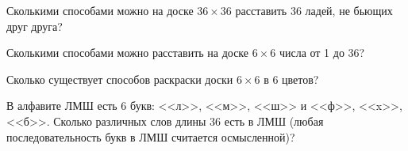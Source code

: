 \begin{problems}
\item Сколькими способами можно на доске $36\times36$  расставить 36 ладей, не бьющих друг друга? %

\item Сколькими способами можно расставить на доске $6\times6$ числа от 1 до 36? %

\item Сколько существует способов раскраски доски $6\times6$ в 6 цветов? %

\item В алфавите ЛМШ есть 6 букв: <<л>>, <<м>>, <<ш>> и <<ф>>, <<x>>, <<б>>. Сколько различных слов длины 36 есть в ЛМШ (любая последовательность букв в ЛМШ считается осмысленной)? %


\end{problems}